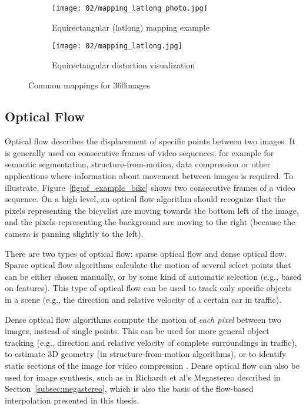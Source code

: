 \begin{figure}
    \hfill
    \begin{subfigure}[t]{0.5\textwidth} 
            \centering
            \texttt{[image: 02/mapping\_latlong\_photo.jpg]}
            \caption{Equirectangular (latlong) mapping example}
            \label{fig:latlong-intro}
    \end{subfigure}%
    \hfill
    \begin{subfigure}[t]{0.5\textwidth}
            \centering
            \texttt{[image: 02/mapping\_latlong.jpg]}
            \caption{Equirectangular distortion visualization}
            \label{fig:latlong-distortion}
    \end{subfigure}
    \hfill
    \caption{Common mappings for 360\degree images}\label{fig:common_mappings}
  \end{figure}
  
\subsection{Optical Flow} \label{subsec:optical_flow}
Optical flow describes the displacement of specific points between two images. It is generally used on consecutive frames of video sequences, for example for semantic segmentation, structure-from-motion, data compression or other applications where information about movement between images is required. To illustrate, Figure~\ref{fig:of_example_bike} shows two consecutive frames of a video sequence. On a high level, an optical flow algorithm should recognize that the pixels representing the bicyclist are moving towards the bottom left of the image, and the pixels representing the background are moving to the right (because the camera is panning slightly to the left).

There are two types of optical flow: sparse optical flow and dense optical flow. Sparse optical flow algorithms calculate the motion of several select points that can be either chosen manually, or by some kind of automatic selection (e.g., based on features). This type of optical flow can be used to track only specific objects in a scene (e.g., the direction and relative velocity of a certain car in traffic).

Dense optical flow algorithms compute the motion of \emph{each pixel} between two images, instead of single points. This can be used for more general object tracking (e.g., direction and relative velocity of complete surroundings in traffic), to estimate 3D geometry (in structure-from-motion algorithms), or to identify static sections of the image for video compression \cite{of-survey}. Dense optical flow can also be used for image synthesis, such as in Richardt et al's Megastereo \cite{megastereo} described in Section~\ref{subsec:megastereo}, which is also the basis of the flow-based interpolation presented in this thesis.


